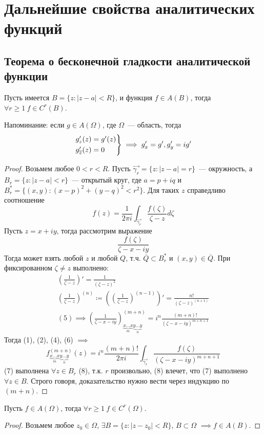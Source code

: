\documentclass[main]{subfiles}
\begin{document}
\chapter[Дальнейшие свойства аналитических функций][Свойства аналитических функций]{Дальнейшие свойства аналитических функций}
\section{Теорема о бесконечной гладкости аналитической функции}
\begin{theorem}\label{4:theorem_with_defs}
    Пусть имеется $B = \{ z: |z - a| < R\}$, и функция $f \in A(B)$, тогда $\forall r \ge 1\ f\in C^r (B)$.
\end{theorem}
\begin{remark}
    Напоминание: если $g \in A(\Omega)$, где $\Omega$~--- область, тогда
    \[\begin{rcases}
            g'_z(z) = g'(z) \\
            g'_{\overline{z}}(z) = 0
        \end{rcases} \implies g'_x = g', g'_y = ig'\]
\end{remark}
\begin{proof}
    Возьмем любое $0< r < R$.
    Пусть $\overrightarrow{\gamma_r} = \{z: |z - a| = r\}$~--- окружность, а
    $B_r = \{z: |z-a|< r\}$~--- открытый круг, где $a = p + iq$ и $B_r^* = \{(x,y) : (x-p)^2 + (y-q)^2 < r^2\}$.
    Для таких $z$ справедливо соотношение
    \[f(z) = \frac{1}{2 \pi i} \int_{\overrightarrow{\gamma_r}} \frac{f(\zeta)}{\zeta - z} d\zeta \tag{4}\]
    Пусть $z = x + iy$, тогда рассмотрим выражение
    \[\frac{f(\zeta)}{\zeta - x - iy}\]
    Тогда может взять любой $z$ и любой $Q$, т.ч. $\overline{Q} \subset B_r^*$ и $(x,y) \in \overline{Q}$.
    При фиксированном $\zeta \neq z$ выполнено:
    \begin{gather*}
        \left( \frac{1}{\zeta - z} \right)' = \frac{1}{(\zeta - z)^2} \\
        \left( \frac{1}{\zeta - z} \right)^{(n)} \coloneq \left(\left(\frac{1}{\zeta - z}\right)^{(n-1)} \right)' = \frac{n!}{(\zeta - z)^{(n+1)}} \tag{5}\\
        (5) \implies \left(\frac{1}{\zeta - x -iy}\right)^{(m+n)}_{\underbrace{x \dotsc x}_m \underbrace{y \dotsc y}_n} = i^n \frac{(m+n)!}{(\zeta -x -iy)^{m+n+1}} \tag{6}
    \end{gather*}
    Тогда (1), (2), (4), (6) $\implies$
    \[f^{(m+n)}_{\underbrace{x \dotsc x}_m \underbrace{y \dotsc y}_n}(z) = i^n \frac{(m+n)!}{2 \pi i} \int_{\overrightarrow{\gamma_r}} \frac{f(\zeta)}{(\zeta - x -iy)^{m+n+1}} \tag{7}\]
    (7) выполнена $\forall z \in B_r$ (8), т.к. $r$ произвольно, (8) влечет, что (7) выполнено $\forall z \in B$.
    Строго говоря, доказательство нужно вести через индукцию по $(m+n)$.
\end{proof}
\begin{corollary}
    Пусть $f \in A(\Omega)$, тогда $\forall r \ge 1\ f\in C^r(\Omega)$.
\end{corollary}
\begin{proof}
    Возьмем любое $z_0 \in \Omega$, $\exists B = \{z: |z - z_0| < R\}$, $B\subset \Omega$ $\implies f \in A(B)$.
\end{proof}
\end{document}
